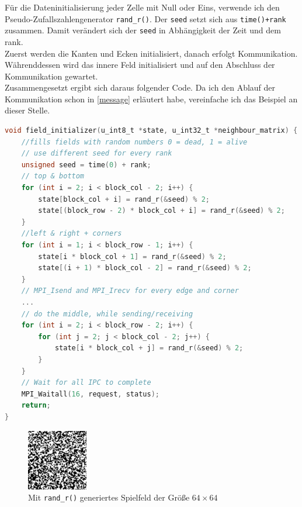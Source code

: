 \documentclass[german,plainarticle,hyperref,utf8]{zihpub}
\begin{document}
	Für die Dateninitialisierung jeder Zelle mit Null oder Eins, verwende ich den Pseudo-Zufallszahlengenerator \texttt{rand\_r()}. Der \texttt{seed} setzt sich aus \texttt{time()+rank} zusammen. Damit verändert sich der \texttt{seed} in Abhängigkeit der Zeit und dem rank.\\
	Zuerst werden die Kanten und Ecken initialisiert, danach erfolgt Kommunikation. Währenddessen wird das innere Feld initialisiert und auf den Abschluss der Kommunikation gewartet.\\
	
	Zusammengesetzt ergibt sich daraus folgender Code. Da ich den Ablauf der Kommunikation schon in \ref{message} erläutert habe, vereinfache ich das Beispiel an dieser Stelle.\\
	
	\begin{lstlisting}[language=C, caption=Daten Initialisierung]
void field_initializer(u_int8_t *state, u_int32_t *neighbour_matrix) {
	//fills fields with random numbers 0 = dead, 1 = alive
	// use different seed for every rank
	unsigned seed = time(0) + rank;
	// top & bottom
	for (int i = 2; i < block_col - 2; i++) {
		state[block_col + i] = rand_r(&seed) % 2;
		state[(block_row - 2) * block_col + i] = rand_r(&seed) % 2;
	}
	//left & right + corners
	for (int i = 1; i < block_row - 1; i++) {
		state[i * block_col + 1] = rand_r(&seed) % 2;
		state[(i + 1) * block_col - 2] = rand_r(&seed) % 2;
	}
	// MPI_Isend and MPI_Irecv for every edge and corner
	...
	// do the middle, while sending/receiving
	for (int i = 2; i < block_row - 2; i++) {
		for (int j = 2; j < block_col - 2; j++) {
			state[i * block_col + j] = rand_r(&seed) % 2;
		}
	}
	// Wait for all IPC to complete
	MPI_Waitall(16, request, status);
	return;
}\end{lstlisting}
	\begin{figure}[h]
		\begin{center}
			\includegraphics[scale=5.0]{initialized_board.pdf}
		\end{center}
		\caption{Mit \texttt{rand\_r()} generiertes Spielfeld der Größe $64\times 64$}
	\end{figure}
	
\end{document}
